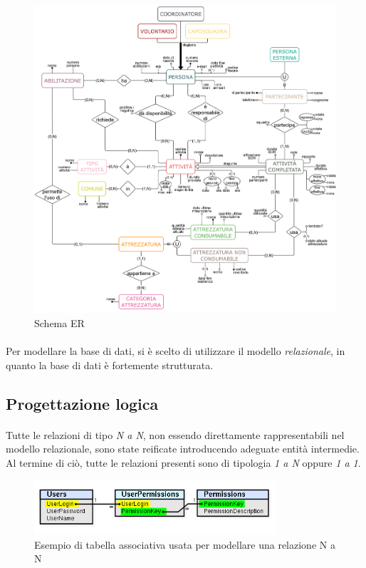 \documentclass[11pt,a4paper,english]{article}
\begin{document}
\begin{figure}[H]
    \centering
    \includegraphics[width=1\textwidth]{img/er-schema.png}
    \caption{Schema ER}
\end{figure}

\paragraph{} Per modellare la base di dati, si è scelto di utilizzare il modello \emph{relazionale}, in quanto la base di dati è fortemente strutturata.

\subsection{Progettazione logica}

\paragraph{} Tutte le relazioni di tipo \emph{N a N}, non essendo direttamente rappresentabili nel modello relazionale, sono state reificate introducendo adeguate entità intermedie. Al termine di ciò, tutte le relazioni presenti sono di tipologia \emph{1 a N} oppure \emph{1 a 1}. 

\begin{figure}[H]
    \centering
    \includegraphics[width=0.8\textwidth]{img/junction_table.png}
    \caption{Esempio di tabella associativa usata per modellare una relazione N a N}
\end{figure}
\end{document}
